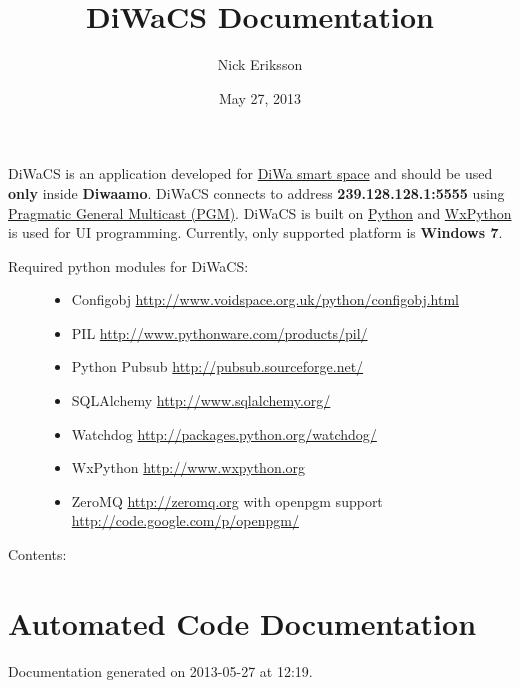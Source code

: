 \documentclass[letterpaper,10pt,english]{sphinxmanual}
\title{DiWaCS Documentation}
\date{May 27, 2013}
\author{Nick Eriksson}
\begin{document}
\maketitle
\tableofcontents
{}\label{index::doc}


DiWaCS is an application developed for \href{https://cse.aalto.fi/research/groups/stratus/research/research-projects/}{DiWa smart space} and should be used \textbf{only} inside \textbf{Diwaamo}. DiWaCS connects to address \textbf{239.128.128.1:5555} using \href{http://code.google.com/p/openpgm/}{Pragmatic General Multicast (PGM)}. DiWaCS is built on \href{http://www.python.org}{Python} and \href{http://www.wxpython.org}{WxPython} is used for UI programming. Currently, only supported platform is \textbf{Windows 7}.
\begin{description}
\item[{Required python modules for DiWaCS:}] \leavevmode\begin{itemize}
\item {} 
Configobj \href{http://www.voidspace.org.uk/python/configobj.html}{http://www.voidspace.org.uk/python/configobj.html}

\item {} 
PIL \href{http://www.pythonware.com/products/pil/}{http://www.pythonware.com/products/pil/}

\item {} 
Python Pubsub \href{http://pubsub.sourceforge.net/}{http://pubsub.sourceforge.net/}

\item {} 
SQLAlchemy \href{http://www.sqlalchemy.org/}{http://www.sqlalchemy.org/}

\item {} 
Watchdog  \href{http://packages.python.org/watchdog/}{http://packages.python.org/watchdog/}

\item {} 
WxPython \href{http://www.wxpython.org}{http://www.wxpython.org}

\item {} 
ZeroMQ \href{http://zeromq.org}{http://zeromq.org} with openpgm support \href{http://code.google.com/p/openpgm/}{http://code.google.com/p/openpgm/}

\end{itemize}

\end{description}

Contents:


\chapter{Automated Code Documentation}
\label{api:automated-code-documentation}\label{api::doc}\label{api:welcome-to-diwacs-documentation}
Documentation generated on 2013-05-27 at 12:19.
\end{document}
